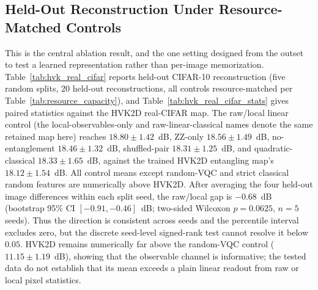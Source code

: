 \documentclass[11pt]{article}
\begin{document}
\subsection{Held-Out Reconstruction Under Resource-Matched Controls}
\label{sec:holdout_headline}
This is the central ablation result, and the one setting designed from the outset to test a learned representation rather than per-image memorization. Table~\ref{tab:hvk_real_cifar} reports held-out CIFAR-10 reconstruction (five random splits, 20 held-out reconstructions, all controls resource-matched per Table~\ref{tab:resource_capacity}), and Table~\ref{tab:hvk_real_cifar_stats} gives paired statistics against the HVK2D real-CIFAR map. The raw/local linear control (the local-observables-only and raw-linear-classical names denote the same retained map here) reaches $18.80\pm1.42$~dB, ZZ-only $18.56\pm1.49$~dB, no-entanglement $18.46\pm1.32$~dB, shuffled-pair $18.31\pm1.25$~dB, and quadratic-classical $18.33\pm1.65$~dB, against the trained HVK2D entangling map's $18.12\pm1.54$~dB. All control means except random-VQC and strict classical random features are numerically above HVK2D. After averaging the four held-out image differences within each split seed, the raw/local gap is $-0.68$~dB (bootstrap 95\% CI $[-0.91,-0.46]$~dB; two-sided Wilcoxon $p=0.0625$, $n=5$ seeds). Thus the direction is consistent across seeds and the percentile interval excludes zero, but the discrete seed-level signed-rank test cannot resolve it below $0.05$. HVK2D remains numerically far above the random-VQC control ($11.15\pm1.19$~dB), showing that the observable channel is informative; the tested data do not establish that its mean exceeds a plain linear readout from raw or local pixel statistics.
\end{document}
